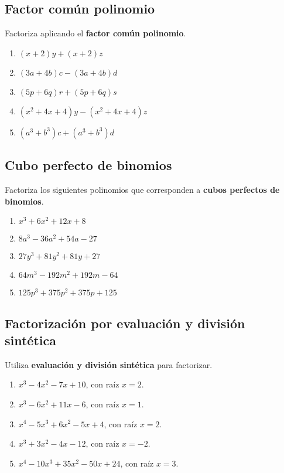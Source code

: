 \documentclass{profesor}
\begin{document}
\subsection{Factor común polinomio}
Factoriza aplicando el \textbf{factor común polinomio}.
\begin{enumerate}
    \item $(x+2)y + (x+2)z$
    \item $(3a+4b)c - (3a+4b)d$
    \item $(5p+6q)r + (5p+6q)s$
    \item $(x^2+4x+4)y - (x^2+4x+4)z$
    \item $(a^3+b^3)c + (a^3+b^3)d$
\end{enumerate}

\subsection{Cubo perfecto de binomios}
Factoriza los siguientes polinomios que corresponden a \textbf{cubos perfectos de binomios}.
\begin{enumerate}
    \item $x^3 + 6x^2 + 12x + 8$
    \item $8a^3 - 36a^2 + 54a - 27$
    \item $27y^3 + 81y^2 + 81y + 27$
    \item $64m^3 - 192m^2 + 192m - 64$
    \item $125p^3 + 375p^2 + 375p + 125$
\end{enumerate}

\subsection{Factorización por evaluación y división sintética}
Utiliza \textbf{evaluación y división sintética} para factorizar.
\begin{enumerate}
    \item $x^3 - 4x^2 - 7x + 10$, con raíz \(x = 2\).
    \item $x^3 - 6x^2 + 11x - 6$, con raíz \(x = 1\).
    \item $x^4 - 5x^3 + 6x^2 - 5x + 4$, con raíz \(x = 2\).
    \item $x^3 + 3x^2 - 4x - 12$, con raíz \(x = -2\).
    \item $x^4 - 10x^3 + 35x^2 - 50x + 24$, con raíz \(x = 3\).
\end{enumerate}
\end{document}
